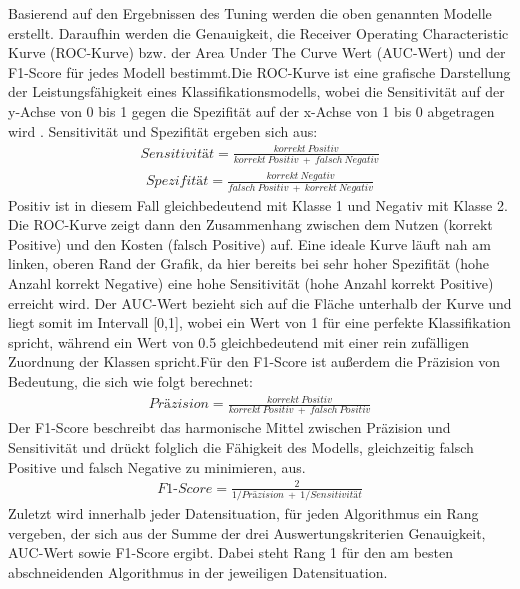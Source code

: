 \documentclass[
]{article}
\begin{document}
Basierend auf den Ergebnissen des Tuning werden die oben genannten
Modelle erstellt. Daraufhin werden die Genauigkeit, die Receiver
Operating Characteristic Kurve (ROC-Kurve) bzw. der Area Under The Curve
Wert (AUC-Wert) und der F1-Score für jedes Modell bestimmt.\newline Die
ROC-Kurve ist eine grafische Darstellung der Leistungsfähigkeit eines
Klassifikationsmodells, wobei die Sensitivität auf der y-Achse von 0 bis
1 gegen die Spezifität auf der x-Achse von 1 bis 0 abgetragen wird
\parencite{fawcettIntroductionROCAnalysis2006}. Sensitivität und
Spezifität ergeben sich aus: \begin{align}
Sensitivität=\frac{korrekt~Positiv}{korrekt~Positiv~+~falsch~Negativ}
\end{align} \begin{align}
Spezifität=\frac{korrekt~Negativ}{falsch~Positiv~+~korrekt~Negativ}
\end{align} Positiv ist in diesem Fall gleichbedeutend mit Klasse 1 und
Negativ mit Klasse 2. Die ROC-Kurve zeigt dann den Zusammenhang zwischen
dem Nutzen (korrekt Positive) und den Kosten (falsch Positive) auf. Eine
ideale Kurve läuft nah am linken, oberen Rand der Grafik, da hier
bereits bei sehr hoher Spezifität (hohe Anzahl korrekt Negative) eine
hohe Sensitivität (hohe Anzahl korrekt Positive) erreicht wird. Der
AUC-Wert bezieht sich auf die Fläche unterhalb der Kurve und liegt somit
im Intervall {[}0,1{]}, wobei ein Wert von 1 für eine perfekte
Klassifikation spricht, während ein Wert von 0.5 gleichbedeutend mit
einer rein zufälligen Zuordnung der Klassen spricht.\newline Für den
F1-Score ist außerdem die Präzision von Bedeutung, die sich wie folgt
berechnet\parencite{fawcettIntroductionROCAnalysis2006}: \begin{align}
Präzision=\frac{korrekt~Positiv}{korrekt~Positiv~+~falsch~Positiv}
\end{align} Der F1-Score beschreibt das harmonische Mittel zwischen
Präzision und Sensitivität und drückt folglich die Fähigkeit des
Modells, gleichzeitig falsch Positive und falsch Negative zu minimieren,
aus. \begin{align}
F1\text{-}Score=\frac{2}{1/Präzision~+~1/Sensitivität}
\end{align}\newline Zuletzt wird innerhalb jeder Datensituation, für
jeden Algorithmus ein Rang vergeben, der sich aus der Summe der drei
Auswertungskriterien Genauigkeit, AUC-Wert sowie F1-Score ergibt. Dabei
steht Rang 1 für den am besten abschneidenden Algorithmus in der
jeweiligen Datensituation.
\end{document}
